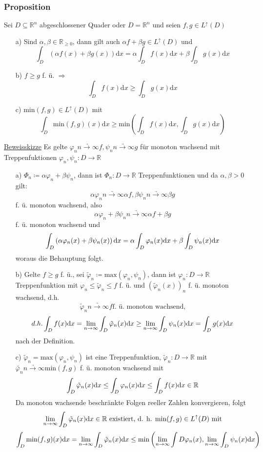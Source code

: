 \subsubsection{Proposition}
Sei $D \subseteq \mathbb{R}^n$ abgeschlossener Quader oder $D = \mathbb{R}^n$ und seien $f,g \in L^\uparrow(D)$
\begin{itemize}
	\item[a)] Sind $\alpha, \beta \in \mathbb{R}_{\geq 0}$, dann gilt auch $\alpha f + \beta g \in L^\uparrow(D)$ und \[\int_D \left(\alpha f(x) + \beta g(x)\right) \text{d}x = \alpha \int_D f(x) \text{d}x + \beta \int_D g(x) \text{d}x\]
	\item[b)] $f \geq g$ f. ü. $\Rightarrow$ \[\int_D f(x) \text{d}x \geq \int_D g(x) \text{d}x\]
	\item[c)] $\text{min}(f,g) \in L^\uparrow (D)$ mit \[\int_D \text{min}(f,g)(x) \text{d}x \geq \text{min} \left(\int_D f(x)\text{d}x, \int_D g(x)\text{d}x\right)\]   
\end{itemize}

\underline{Beweisskizze} Es gelte $\varphi_n \underrightarrow{n \to \infty} f, \psi_n \underrightarrow{n \to \infty} g$ für monoton wachsend mit Treppenfuktionen $\varphi_n, \psi_n \colon D \to \mathbb{R}$
\begin{itemize}
	\item[a)] $\Phi_n \coloneqq \alpha \varphi_n + \beta \psi_n$, dann ist $\Phi_n \colon D \to \mathbb{R}$ Treppenfunktionen und da $\alpha, \beta >0$ gilt: \[\alpha\varphi_n \underrightarrow{n \to \infty} \alpha f, \beta\psi_n \underrightarrow{n \to \infty} \beta g\] f. ü. monoton wachsend, also \[\alpha \varphi_n + \beta \psi_n \underrightarrow{n \to \infty} \alpha f + \beta g\] f. ü. monoton wachsend und \[\int_D \left(\alpha\varphi_n(x) + \beta\psi_n(x)\right) \text{d}x = \alpha \int_D \varphi_n(x)  \text{d}x + \beta\int_D \psi_n(x) \text{d}x\] woraus die Behauptung folgt.
	\item[b)] Gelte $f \geq g$ f. ü., sei $\tilde{\varphi}_n \coloneqq \text{max}(\varphi_n, \psi_n)$, dann ist $\varphi_n \colon D \to  \mathbb{R}$ Treppenfunktion mit $\varphi_n \leq \tilde{\varphi}_n \leq f$ f. ü. und $(\tilde{\varphi}_n(x))_n$ f. ü. monoton wachsend, d.h. \[\tilde{\varphi}_n \underrightarrow{n \to \infty} f \text{f. ü. monoton wachsend,}\]
	\[d.h. \int_D f(x) \text{d}x = \lim_{n \to \infty} \int_D \tilde{\varphi}_n(x) \text{d}x \geq \lim_{n \to \infty} \int_D \psi_n(x) \text{d}x = \int_D g(x) \text{d}x\]
	nach der Definition.
	\item[c)] $\tilde{\varphi}_n = \text{max}(\varphi_n,\psi_n)$ ist eine Treppenfunktion, $\tilde{\varphi}_n \colon D \to \mathbb{R}$ mit $\tilde{\varphi_n} \underrightarrow{n \to \infty} \text{min}(f,g)$ f. ü. monoton wachsend mit \[\int_D \tilde{\varphi}_n(x) \text{d}x \leq \int_D \varphi_n(x) \text{d}x \leq \int_D f(x) \text{d}x \in \mathbb{R}\] Da monoton wachsende beschränkte Folgen reeller Zahlen konvergieren, folgt \[\lim_{n \to \infty} \int_D \tilde{\varphi}_n(x) \text{d}x \in \mathbb{R} \text{ existiert, d. h. min}(f,g) \in L^\uparrow(D) \text{ mit}\] \[\int_D \text{min}(f,g)(x) \text{d}x = \lim_{n \to \infty} \int_D \tilde{\varphi}_n(x) \text{d}x \leq \text{min}\left(\lim_{n \to \infty} \int{D}{\varphi_n(x)}, \lim_{n \to \infty} \int_D \psi_n(x) \text{d}x\right)\]
\end{itemize}
